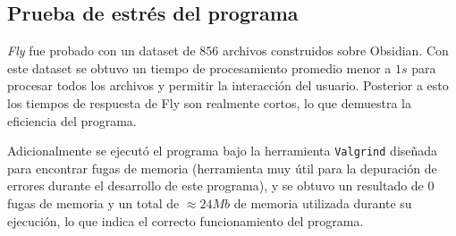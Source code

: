 \subsection{Prueba de estrés del programa}
\textit{Fly} fue probado con un dataset de $856$ archivos construidos sobre Obsidian. Con este dataset se obtuvo un tiempo de procesamiento promedio menor a $1s$ para procesar todos los archivos y permitir la interacción del usuario. Posterior a esto los tiempos de respuesta de Fly son realmente cortos, lo que demuestra la eficiencia del programa.

Adicionalmente se ejecutó el programa bajo la herramienta \texttt{Valgrind} diseñada para encontrar fugas de memoria (herramienta muy útil para la depuración de errores durante el desarrollo de este programa), y se obtuvo un resultado de $0$ fugas de memoria y un total de $\approx 24Mb$ de memoria utilizada durante su ejecución, lo que indica el correcto funcionamiento del programa.